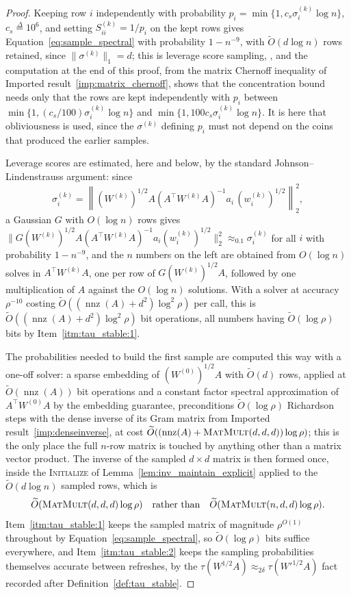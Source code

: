 \documentclass[11pt]{article}
\newcommand{\nnz}{\operatorname{nnz}}
\newcommand{\MM}{\textsc{MatMult}}
\renewcommand{\O}{\widetilde O}
\newcommand{\defeq}{\stackrel{\Delta}{=}}
\begin{document}
\begin{proof}
Keeping row $i$ independently with probability
$p_i = \min\{1, c_s \sigma^{(k)}_i \log n\}$,
$c_s \defeq 10^{6}$, and setting
$S^{(k)}_{ii} = 1 / p_i$ on the kept rows gives
Equation~\eqref{eq:sample_spectral} with probability $1 - n^{-9}$, with
$\O(d \log n)$ rows retained, since
$\|\sigma^{(k)}\|_1 = d$; this is leverage score sampling,
\cite{SS11:journal}, and the computation at the end of this
proof, from the matrix Chernoff inequality of Imported
result~\ref{imp:matrix_chernoff}, shows that the concentration bound needs only
that the rows are kept independently with $p_i$ between
$\min\{1, (c_s / 100) \sigma^{(k)}_i \log n\}$ and
$\min\{1, 100 c_s \sigma^{(k)}_i \log n\}$.
It is here that obliviousness is used, since the $\sigma^{(k)}$ defining
$p_i$ must not depend on the coins that produced the earlier samples.

Leverage scores are estimated, here and below, by the standard
Johnson--Lindenstrauss argument: since
\[
\sigma^{(k)}_i
=
\left\| (W^{(k)})^{1/2} A \left( A^\top W^{(k)} A \right)^{-1}
a_i \, (w^{(k)}_i)^{1/2} \right\|_2^2 ,
\]
a Gaussian $G$ with
$O(\log n)$ rows gives
$\|G (W^{(k)})^{1/2} A (A^\top W^{(k)} A)^{-1} a_i (w^{(k)}_i)^{1/2}\|_2^2 \approx_{0.1} \sigma^{(k)}_i$
for all $i$ with probability
$1 - n^{-9}$, and the
$n$ numbers on the left are obtained from
$O(\log n)$ solves in
$A^\top W^{(k)} A$, one per row of
$G (W^{(k)})^{1/2} A$, followed by one multiplication of
$A$ against the
$O(\log n)$ solutions.
With a solver at accuracy $\rho^{-10}$ costing
$\O((\nnz(A) + d^{2}) \log^{2} \rho)$ per call, this is
$\O((\nnz(A) + d^{2}) \log^{2} \rho)$ bit operations, all numbers having
$\O(\log \rho)$ bits by Item~\ref{itm:tau_stable:1}.

The probabilities needed to build the first sample are computed this way with a
one-off solver: a sparse embedding \cite{CW17:journal} of
$(W^{(0)})^{1/2} A$ with
$\O(d)$ rows, applied at
$\O(\nnz(A))$ bit operations and a constant factor spectral approximation of
$A^\top W^{(0)} A$ by the embedding guarantee, preconditions
$\O(\log \rho)$ Richardson steps with the dense inverse of its Gram matrix from
Imported result~\ref{imp:denseinverse}, at cost
$\O((\nnz(A) + \MM(d, d, d)) \log \rho)$; this is the only place the full
$n$-row matrix is touched by anything other than a matrix vector product.
The inverse of the sampled $d \times d$ matrix is then formed once, inside the
\textsc{Initialize} of Lemma~\ref{lem:inv_maintain_explicit} applied to the
$\O(d \log n)$ sampled rows, which is
\[
\O(\MM(d, d, d) \log \rho)
\quad\text{rather than}\quad
\O(\MM(n, d, d) \log \rho) .
\]
Item~\ref{itm:tau_stable:1} keeps the sampled matrix of magnitude $\rho^{O(1)}$
throughout by Equation~\eqref{eq:sample_spectral}, so $\O(\log \rho)$ bits
suffice everywhere, and Item~\ref{itm:tau_stable:2} keeps the sampling
probabilities themselves accurate between refreshes, by the
$\tau(W^{1/2} A) \approx_{2 \delta} \tau(W'^{1/2} A)$ fact recorded after
Definition~\ref{def:tau_stable}.


\end{proof}
\end{document}
